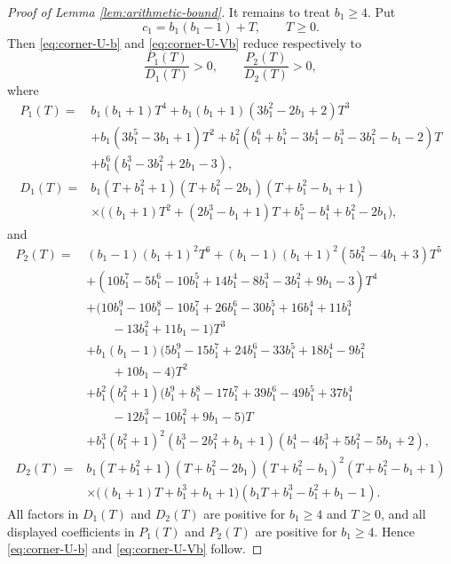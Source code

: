 \documentclass[11pt]{amsart}
\begin{document}
\begin{proof}[Proof of Lemma \ref{lem:arithmetic-bound}]
It remains to treat $b_1\ge4$.  Put
$$
        c_1=b_1(b_1-1)+T,
        \qquad T\ge0.
$$
Then \eqref{eq:corner-U-b} and \eqref{eq:corner-U-Vb} reduce respectively to
$$
        \frac{P_1(T)}{D_1(T)}>0,
        \qquad
        \frac{P_2(T)}{D_2(T)}>0,
$$
where
\begin{align*}
P_1(T)={}&b_1(b_1+1)T^4
        +b_1(b_1+1)(3b_1^2-2b_1+2)T^3\\
        &+b_1(3b_1^5-3b_1+1)T^2
        +b_1^2(b_1^6+b_1^5-3b_1^4-b_1^3-3b_1^2-b_1-2)T\\
        &+b_1^6(b_1^3-3b_1^2+2b_1-3),\\[3pt]
D_1(T)={}&b_1(T+b_1^2+1)(T+b_1^2-2b_1)(T+b_1^2-b_1+1)\\
        &\times\bigl((b_1+1)T^2+(2b_1^3-b_1+1)T+b_1^5-b_1^4+b_1^2-2b_1\bigr),
\end{align*}
and
\begin{align*}
P_2(T)={}&(b_1-1)(b_1+1)^2T^6
        +(b_1-1)(b_1+1)^2(5b_1^2-4b_1+3)T^5\\
        &+(10b_1^7-5b_1^6-10b_1^5+14b_1^4-8b_1^3-3b_1^2+9b_1-3)T^4\\
        &+(10b_1^9-10b_1^8-10b_1^7+26b_1^6-30b_1^5+16b_1^4+11b_1^3\\
        &\qquad -13b_1^2+11b_1-1)T^3\\
        &+b_1(b_1-1)(5b_1^9-15b_1^7+24b_1^6-33b_1^5+18b_1^4-9b_1^2\\
        &\qquad +10b_1-4)T^2\\
        &+b_1^2(b_1^2+1)(b_1^9+b_1^8-17b_1^7+39b_1^6-49b_1^5+37b_1^4\\
        &\qquad -12b_1^3-10b_1^2+9b_1-5)T\\
        &+b_1^3(b_1^2+1)^2(b_1^3-2b_1^2+b_1+1)(b_1^4-4b_1^3+5b_1^2-5b_1+2),\\[3pt]
D_2(T)={}&b_1(T+b_1^2+1)(T+b_1^2-2b_1)(T+b_1^2-b_1)^2(T+b_1^2-b_1+1)\\
        &\times\bigl((b_1+1)T+b_1^3+b_1+1\bigr)(b_1T+b_1^3-b_1^2+b_1-1).
\end{align*}
All factors in $D_1(T)$ and $D_2(T)$ are positive for $b_1\ge4$ and $T\ge0$, and all displayed coefficients in $P_1(T)$ and $P_2(T)$ are positive for $b_1\ge4$.  Hence \eqref{eq:corner-U-b} and \eqref{eq:corner-U-Vb} follow.


\end{proof}
\end{document}
